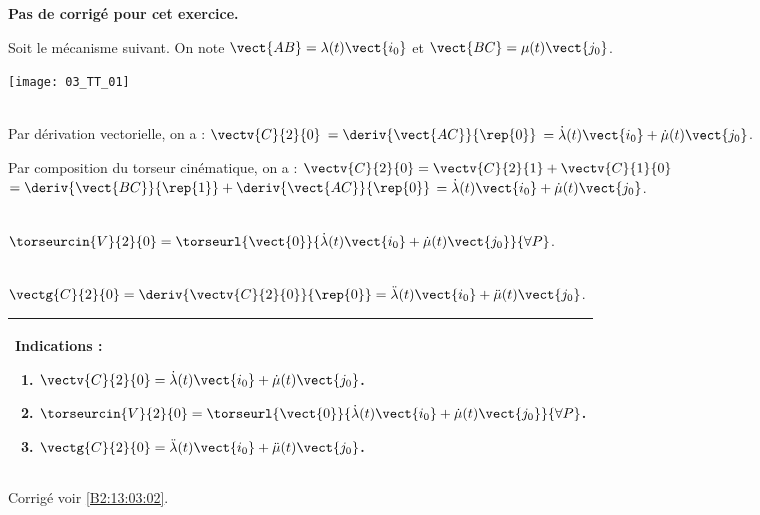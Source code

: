 \normaltrue
\correctiontrue



\setcounter{numques}{0}
\ifcorrection
\else
\textbf{Pas de corrigé pour cet exercice.}
\fi

\ifprof
\else
Soit le mécanisme suivant. On note $\vect{AB}=\lambda(t)\vect{i_0}$ et $\vect{BC}=\mu(t)\vect{j_0}$.
\begin{center}
\texttt{[image: 03\_TT\_01]}
\end{center}
\fi

\ifprof~\\ 

Par dérivation vectorielle, on a : $\vectv{C}{2}{0} $
$ = \deriv{\vect{AC}}{\rep{0}}$
$ = \dot{\lambda}(t)\vect{i_0}+\dot{\mu}(t)\vect{j_0}$.

Par composition du torseur cinématique, on a : 
$\vectv{C}{2}{0} = \vectv{C}{2}{1} +\vectv{C}{1}{0}$
$ = \deriv{\vect{BC}}{\rep{1}}+\deriv{\vect{AC}}{\rep{0}}$
$ = \dot{\lambda}(t)\vect{i_0}+\dot{\mu}(t)\vect{j_0}$.
\else
\fi

\ifprof ~\\
$\torseurcin{V}{2}{0}= \torseurl{\vect{0}}{\dot{\lambda}(t)\vect{i_0}+\dot{\mu}(t)\vect{j_0}}{\forall P}$.
\else
\fi

\ifprof ~\\
 $\vectg{C}{2}{0} = \deriv{\vectv{C}{2}{0}}{\rep{0}}=\ddot{\lambda}(t)\vect{i_0}+\ddot{\mu}(t)\vect{j_0}$.
\else
\fi

\ifprof
\else
\footnotesize
\begin{center}
\begin{tabular}{|p{.9\linewidth}|}
\hline
Indications :
\begin{enumerate}
\item $\vectv{C}{2}{0} =  \dot{\lambda}(t)\vect{i_0}+\dot{\mu}(t)\vect{j_0}$.
\item $\torseurcin{V}{2}{0}= \torseurl{\vect{0}}{\dot{\lambda}(t)\vect{i_0}+\dot{\mu}(t)\vect{j_0}}{\forall P}$.
\item $\vectg{C}{2}{0} = \ddot{\lambda}(t)\vect{i_0}+\ddot{\mu}(t)\vect{j_0}$.
\end{enumerate} \\ \hline
\end{tabular}
\end{center}
\normalsize

\begin{flushright}
\footnotesize{Corrigé  voir \ref{B2:13:03:02}.}
\end{flushright}%
\fi


